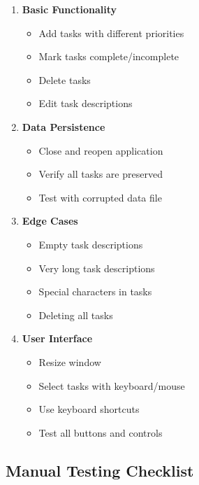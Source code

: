 \documentclass[
  letterpaper,
  DIV=11,
  numbers=noendperiod,
  oneside]{scrreprt}
\providecommand{\tightlist}{%
  \setlength{\itemsep}{0pt}\setlength{\parskip}{0pt}}\usepackage{longtable,booktabs,array}
\begin{document}
\begin{enumerate}
\def\labelenumi{\arabic{enumi}.}
\tightlist
\item
  \textbf{Basic Functionality}

  \begin{itemize}
  \tightlist
  \item
    Add tasks with different priorities
  \item
    Mark tasks complete/incomplete
  \item
    Delete tasks
  \item
    Edit task descriptions
  \end{itemize}
\item
  \textbf{Data Persistence}

  \begin{itemize}
  \tightlist
  \item
    Close and reopen application
  \item
    Verify all tasks are preserved
  \item
    Test with corrupted data file
  \end{itemize}
\item
  \textbf{Edge Cases}

  \begin{itemize}
  \tightlist
  \item
    Empty task descriptions
  \item
    Very long task descriptions
  \item
    Special characters in tasks
  \item
    Deleting all tasks
  \end{itemize}
\item
  \textbf{User Interface}

  \begin{itemize}
  \tightlist
  \item
    Resize window
  \item
    Select tasks with keyboard/mouse
  \item
    Use keyboard shortcuts
  \item
    Test all buttons and controls
  \end{itemize}
\end{enumerate}

\subsection{Manual Testing Checklist}\label{manual-testing-checklist}
\end{document}
